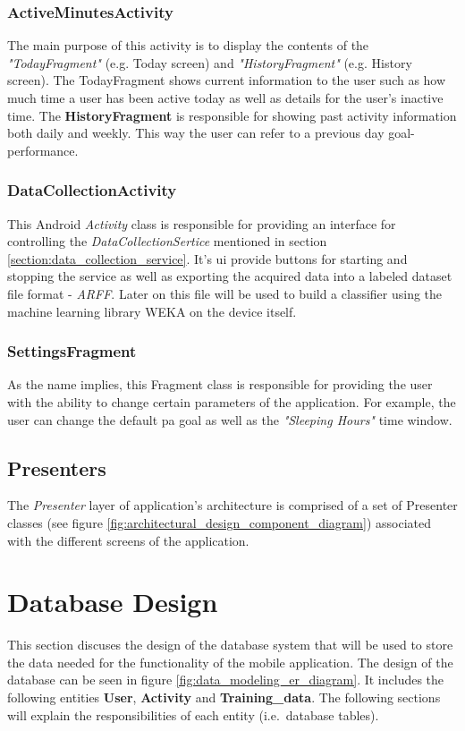             \subsubsection{ActiveMinutesActivity}
            The main purpose of this activity is to display the contents of the \textit{"TodayFragment"} (e.g. Today screen) and \textit{"HistoryFragment"} (e.g. History screen). The TodayFragment shows current information to the user such as how much time a user has been active today as well as details for the user's inactive time. The \textbf{HistoryFragment} is responsible for showing past activity information both daily and weekly. This way the user can refer to a previous day goal-performance.
            
            \subsubsection{DataCollectionActivity}
            This Android \textit{Activity} class is responsible for providing an interface for controlling the \textit{DataCollectionSertice} mentioned in section \ref{section:data_collection_service}. It's \gls{ui} provide buttons for starting and stopping the service as well as exporting the acquired data into a labeled dataset file format - \textit{ARFF}. Later on this file will be used to build a classifier using the machine learning library WEKA on the device itself.
            
            \subsubsection{SettingsFragment}
            As the name implies, this Fragment class is responsible for providing the user with the ability to change certain parameters of the application. For example, the user can change the default \gls{pa} goal as well as the \textit{"Sleeping Hours"} time window.
            
            
        \subsection{Presenters}
        The \textit{Presenter} layer of application's architecture is comprised of a set of Presenter classes (see figure  \ref{fig:architectural_design_component_diagram}) associated with the different screens of the application.
    
    \section{Database Design}
    \label{section:database-design}
    This section discuses the design of the database system that will be used to store the data needed for the functionality of the mobile application. The design of the database can be seen in figure \ref{fig:data_modeling_er_diagram}. It includes the following entities \textbf{User}, \textbf{Activity} and \textbf{Training\_data}. The following sections will explain the responsibilities of each entity (i.e.\ database tables).
        
